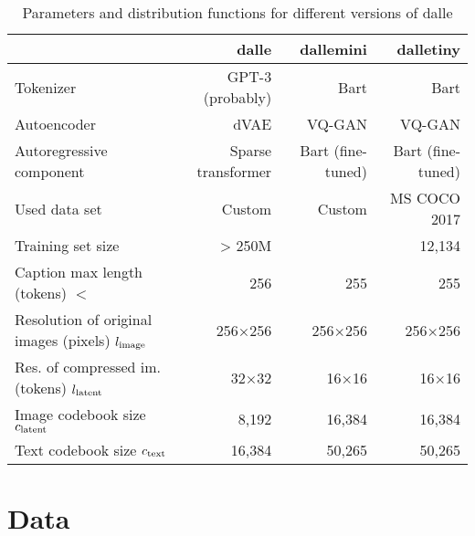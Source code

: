 \documentclass{article}
\begin{document}
\begin{table*}[h!]
    \centering
    \begin{tabular}{|l|r|r|r|}
    \hline
        ~ & \gls{dalle} & \gls{dallemini} & \gls{dalletiny} \\ \hline
        Tokenizer & GPT-3 (probably) & Bart & Bart \\ \hline
        Autoencoder & dVAE & VQ-GAN & VQ-GAN \\ \hline
        Autoregressive component & Sparse transformer & Bart (fine-tuned) & Bart (fine-tuned) \\ \hline \hline
        Used data set & Custom & Custom & MS COCO 2017 \\ \hline
        Training set size & > 250M & ~ & 12,134 \\ \hline \hline
        Caption max length (tokens) $\lt$ & 256 & 255  & 255 \\ \hline
        Resolution of original images (pixels) $l_{\mathrm{image}}$ & 256×256 & 256×256  & 256×256 \\ \hline
        Res. of compressed im. (tokens) ${l_{\mathrm{latent}}}$ & 32×32 & 16×16 & 16×16 \\ \hline
        Image codebook size ${c_{\mathrm{latent}}}$ & 8,192 & 16,384  & 16,384 \\ \hline
        Text codebook size ${c_{\mathrm{text}}}$ & 16,384 & 50,265 & 50,265 \\ \hline
    \end{tabular}
    \caption{Parameters and distribution functions for different versions of \gls{dalle}}
    \label{tab:parameters}
\end{table*}

\section{Data}
\end{document}
